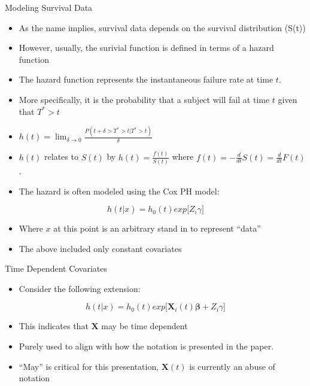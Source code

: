 \documentclass[
  ignorenonframetext,
]{beamer}
\providecommand{\tightlist}{%
  \setlength{\itemsep}{0pt}\setlength{\parskip}{0pt}}
\begin{document}
\begin{frame}{Modeling Survival Data}
\protect\hypertarget{modeling-survival-data}{}
\begin{itemize}
\tightlist
\item
  As the name implies, survival data depends on the survival
  distribution (S(t))
\item
  However, usually, the surivial function is defined in terms of a
  hazard function
\item
  The hazard function represents the instantaneous failure rate at time
  \(t\).
\item
  More specifically, it is the probability that a subject will fail at
  time \(t\) given that \(T^* > t\)
\item
  \(h(t) = \lim_{\delta \rightarrow 0} \frac{P(t + \delta > T^* > t | T^* > t)}{\delta}\)
\item
  \(h(t)\) relates to \(S(t)\) by \(h(t) = \frac{f(t)}{S(t)}\) where
  \(f(t) = -\frac{d}{dt}S(t) =\frac{d}{dt}F(t)\).
\item
  The hazard is often modeled using the Cox PH model:
\end{itemize}

\[
h(t|x) = h_0(t)exp \Big[Z_i \gamma \Big]
\]

\begin{itemize}
\tightlist
\item
  Where \(x\) at this point is an arbitrary stand in to represent
  ``data''
\item
  The above included only constant covariates
\end{itemize}
\end{frame}

\begin{frame}{Time Dependent Covariates}
\protect\hypertarget{time-dependent-covariates}{}
\begin{itemize}
\tightlist
\item
  Consider the following extension:
\end{itemize}

\[
h(t|x) = h_0(t)exp \Big[\boldsymbol{X}_i(t)\boldsymbol{\beta} + Z_i \gamma \Big]
\]

\begin{itemize}
\tightlist
\item
  This indicates that \(\boldsymbol{X}\) may be time dependent
\item
  Purely used to align with how the notation is presented in the paper.
\item
  ``May'' is critical for this presentation, \(\boldsymbol{X}(t)\) is
  currently an abuse of notation
\end{itemize}
\end{frame}
\end{document}
